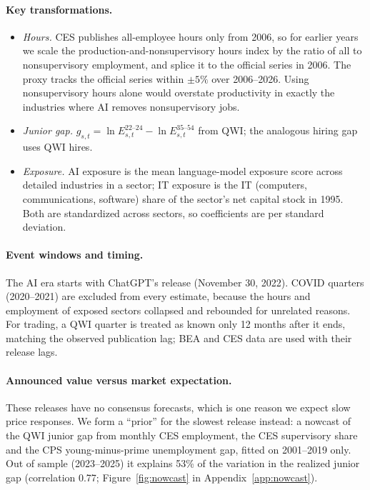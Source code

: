 \paragraph{Key transformations.}
\begin{itemize}
  \item \emph{Hours.} CES publishes all-employee hours only from 2006, so for earlier years we scale the production-and-nonsupervisory hours index by the ratio of all to nonsupervisory employment, and splice it to the official series in 2006. The proxy tracks the official series within $\pm5\%$ over 2006--2026. Using nonsupervisory hours alone would overstate productivity in exactly the industries where AI removes nonsupervisory jobs.
  \item \emph{Junior gap.} $g_{s,t} = \ln E_{s,t}^{22\text{--}24} - \ln E_{s,t}^{35\text{--}54}$ from QWI; the analogous hiring gap uses QWI hires.
  \item \emph{Exposure.} AI exposure is the mean language-model exposure score across detailed industries in a sector; IT exposure is the IT (computers, communications, software) share of the sector's net capital stock in 1995. Both are standardized across sectors, so coefficients are per standard deviation.
\end{itemize}

\paragraph{Event windows and timing.} The AI era starts with ChatGPT's release (November 30, 2022). COVID quarters (2020--2021) are excluded from every estimate, because the hours and employment of exposed sectors collapsed and rebounded for unrelated reasons. For trading, a QWI quarter is treated as known only 12 months after it ends, matching the observed publication lag; BEA and CES data are used with their release lags.

\paragraph{Announced value versus market expectation.} These releases have no consensus forecasts, which is one reason we expect slow price responses. We form a ``prior'' for the slowest release instead: a nowcast of the QWI junior gap from monthly CES employment, the CES supervisory share and the CPS young-minus-prime unemployment gap, fitted on 2001--2019 only. Out of sample (2023--2025) it explains 53\% of the variation in the realized junior gap (correlation 0.77; Figure~\ref{fig:nowcast} in Appendix~\ref{app:nowcast}).

